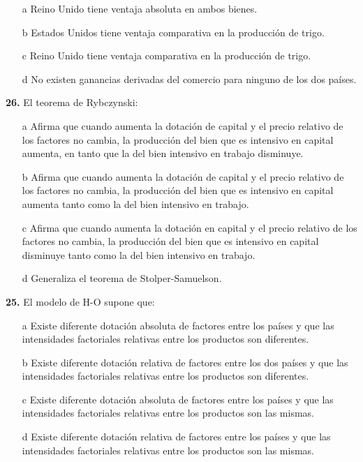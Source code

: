 \documentclass{nuevotema}
\begin{document}
\medskip

\begin{enumerate}
	\item[a] Reino Unido tiene ventaja absoluta en ambos bienes.
	\item[b] Estados Unidos tiene ventaja comparativa en la producción de trigo.
	\item[c] Reino Unido tiene ventaja comparativa en la producción de trigo.
	\item[d] No existen ganancias derivadas del comercio para ninguno de los dos países.
\end{enumerate}

\textbf{26.} El teorema de Rybczynski:

\begin{enumerate}
	\item[a] Afirma que cuando aumenta la dotación de capital y el precio relativo de los factores no cambia, la producción del bien que es intensivo en capital aumenta, en tanto que la del bien intensivo en trabajo disminuye.
	\item[b] Afirma que cuando aumenta la dotación de capital y el precio relativo de los factores no cambia, la producción del bien que es intensivo en capital aumenta tanto como la del bien intensivo en trabajo.
	\item[c] Afirma que cuando aumenta la dotación en capital y el precio relativo de los factores no cambia, la producción del bien que es intensivo en capital disminuye tanto como la del bien intensivo en trabajo.
	\item[d] Generaliza el teorema de Stolper-Samuelson.
\end{enumerate}


\textbf{25.} El modelo de H-O supone que:

\begin{enumerate}
	\item[a] Existe diferente dotación absoluta de factores entre los países y que las intensidades factoriales relativas entre los productos son diferentes.
	\item[b] Existe diferente dotación relativa de factores entre los dos países y que las intensidades factoriales relativas entre los productos son diferentes.
	\item[c] Existe diferente dotación absoluta de factores entre los países y que las intensidades factoriales relativas entre los productos son las mismas.
	\item[d] Existe diferente dotación relativa de factores entre los países y que las intensidades factoriales relativas entre los productos son las mismas.
\end{enumerate}
\end{document}
